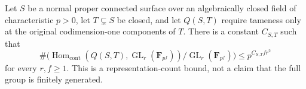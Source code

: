 \begin{theorem}
\label{D:tame-global-quadratic-representation-bound}
Let $S$ be a normal proper connected surface over an
algebraically closed field of characteristic $p>0$,
let $T\subsetneq S$ be closed, and let $Q(S,T)$ require
tameness only at the original codimension-one components
of $T$.  There is a constant $C_{S,T}$ such that
\[
 \#\bigl(
  \operatorname{Hom}_{\mathrm{cont}}
       (Q(S,T),\operatorname{GL}_r(\mathbf F_{p^f}))
       /\operatorname{GL}_r(\mathbf F_{p^f})\bigr)
          \le p^{C_{S,T}fr^2}                           \tag{D.TQ.1}
\]
for every $r,f\ge1$.
This is a representation-count bound, not a claim
that the full group is finitely generated.
\end{theorem}

